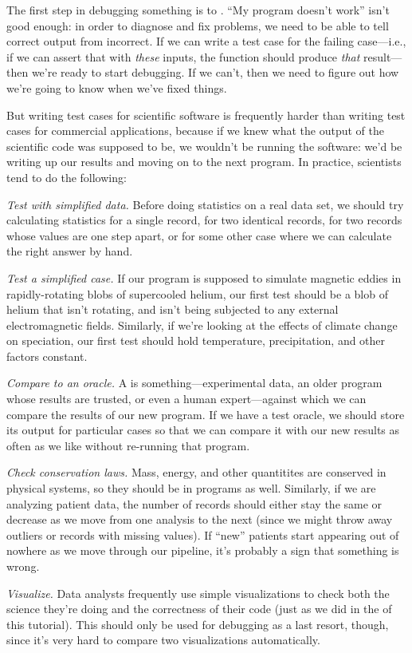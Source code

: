 The first step in debugging something is to
. ``My program doesn't work'' isn't good enough: in order
to diagnose and fix problems, we need to be able to tell correct output
from incorrect. If we can write a test case for the failing case---i.e.,
if we can assert that with \emph{these} inputs, the function should
produce \emph{that} result--- then we're ready to start debugging. If we
can't, then we need to figure out how we're going to know when we've
fixed things.

But writing test cases for scientific software is frequently harder than
writing test cases for commercial applications, because if we knew what
the output of the scientific code was supposed to be, we wouldn't be
running the software: we'd be writing up our results and moving on to
the next program. In practice, scientists tend to do the following:

\begin{swcenumerate}
\item
  \emph{Test with simplified data.} Before doing statistics on a real
  data set, we should try calculating statistics for a single record,
  for two identical records, for two records whose values are one step
  apart, or for some other case where we can calculate the right answer
  by hand.
\item
  \emph{Test a simplified case.} If our program is supposed to simulate
  magnetic eddies in rapidly-rotating blobs of supercooled helium, our
  first test should be a blob of helium that isn't rotating, and isn't
  being subjected to any external electromagnetic fields. Similarly, if
  we're looking at the effects of climate change on speciation, our
  first test should hold temperature, precipitation, and other factors
  constant.
\item
  \emph{Compare to an oracle.} A 
  is something---experimental data, an older program whose results are
  trusted, or even a human expert---against which we can compare the
  results of our new program. If we have a test oracle, we should store
  its output for particular cases so that we can compare it with our new
  results as often as we like without re-running that program.
\item
  \emph{Check conservation laws.} Mass, energy, and other quantitites
  are conserved in physical systems, so they should be in programs as
  well. Similarly, if we are analyzing patient data, the number of
  records should either stay the same or decrease as we move from one
  analysis to the next (since we might throw away outliers or records
  with missing values). If ``new'' patients start appearing out of
  nowhere as we move through our pipeline, it's probably a sign that
  something is wrong.
\item
  \emph{Visualize.} Data analysts frequently use simple visualizations
  to check both the science they're doing and the correctness of their
  code (just as we did in the  of
  this tutorial). This should only be used for debugging as a last
  resort, though, since it's very hard to compare two visualizations
  automatically.
\end{swcenumerate}

